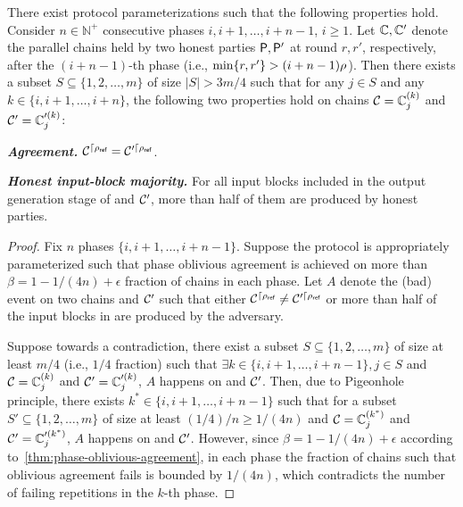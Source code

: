\begin{corollary}
    \label{corollary:super-phase-oblivious-agreement}
    There exist protocol parameterizations such that the following properties hold.
    Consider $n \in \mathbb{N}^+$ consecutive phases $i, i + 1, \ldots, i + n - 1$, $i \ge 1$.
    Let $\mathbb{C}, \mathbb{C}'$ denote the parallel chains held by two honest parties $\mathsf{P}, \mathsf{P}'$ at round $r, r'$, respectively, after the $(i + n - 1)$-th phase (i.e., $\min\{r, r'\} > (i + n - 1) \rho$).
    Then there exists a subset $S \subseteq \{1, 2, \ldots, m \}$ of size $|S| > 3m / 4$ such that for any $j \in S$ and any $k \in \{i, i + 1, \ldots, i + n\}$, the following two properties hold on chains $\mathcal{C} = \mathbb{C}^{(k)}_j$ and $\mathcal{C}' = \mathbb{C}'^{(k)}_j$:
    \begin{cccItemize}[nosep]
        \item \textbf{\emph{Agreement.}} $\mathcal{C}^{\lceil{\ensuremath{\rho_{\textsf{ref}}}}} = \mathcal{C}'^{\lceil{\ensuremath{\rho_{\textsf{ref}}}}}$.
       
        \item \textbf{\emph{Honest input-block majority.}} For all input blocks included in the output generation stage of \chain and $\mathcal{C}'$, more than half of them are produced by honest parties.
    \end{cccItemize}
\end{corollary}

\begin{proof}
    Fix $n$ phases $\{i, i + 1, \ldots, i + n - 1 \}$.
    Suppose the protocol is appropriately parameterized such that phase oblivious agreement is achieved on more than $\beta = 1 - 1 / (4n) + \epsilon$ fraction of chains in each phase.
    Let $A$ denote the (bad) event on two chains \chain and $\mathcal{C}'$ such that either $\mathcal{C}^{\lceil{\ensuremath{\rho_{\textsf{ref}}}}} \neq \mathcal{C}'^{\lceil{\ensuremath{\rho_{\textsf{ref}}}}}$ or more than half of the input blocks in \chain are produced by the adversary.

    Suppose towards a contradiction, there exist a subset $S \subseteq \{1, 2, \ldots, m \}$ of size at least $m / 4$ (i.e., $1 / 4$ fraction) such that $\exists k \in \{i, i + 1, \ldots, i + n - 1\}, j \in S$ and $\mathcal{C} = \mathbb{C}^{(k)}_j$ and $\mathcal{C}' = \mathbb{C}'^{(k)}_j$, $A$ happens on \chain and $\mathcal{C}'$.
    Then, due to Pigeonhole principle, there exists $k^* \in \{i, i + 1, \ldots, i + n - 1\}$ such that for a subset $S' \subseteq \{1, 2, \ldots, m \}$ of size at least $(1 / 4) / n \ge 1 / (4n)$ and $\mathcal{C} = \mathbb{C}^{(k^*)}_j$ and $\mathcal{C}' = \mathbb{C}'^{(k^*)}_j$, $A$ happens on \chain and $\mathcal{C}'$.
    However, since $\beta = 1 - 1 / (4n) + \epsilon$ according to~\cref{thm:phase-oblivious-agreement}, in each phase the fraction of chains such that oblivious agreement fails is bounded by $1 / (4n)$, which contradicts the number of failing repetitions in the $k$-th phase.
\end{proof}

